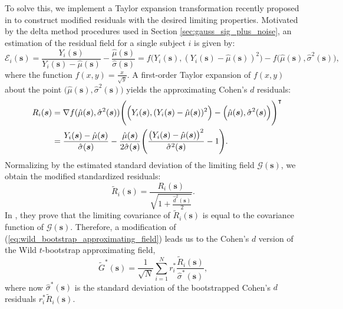 To solve this, we implement a Taylor expansion transformation recently proposed in \citet*{FABIANSPAPER} to construct modified residuals with the desired limiting properties. Motivated by the delta method procedures used in Section \ref{sec:gauss_sig_plus_noise}, an estimation of the residual field for a single subject $i$ is given by:
\begin{equation}
\label{eq:single_subject_residuals}
\mathcal{E}_{i}(\bm{s}) = \frac{Y_{i}(\bm{s})}{Y_{i}(\bm{s}) - \hat{\mu}(\bm{s})} - \frac{\hat{\mu}(\bm{s})}{\hat{\sigma}(\bm{s})} = f\Big(Y_{i}(\bm{s}),(Y_{i}(\bm{s}) - \hat{\mu}(\bm{s}))^{2}\Big) - f\Big(\hat{\mu}(\bm{s}), \hat{\sigma}^{2}(\bm{s})\Big),
\end{equation}
where the function $f(x,y) = \frac{x}{\sqrt{y}}$. A first-order Taylor expansion of $f(x,y)$ about the point $\Big(\hat{\mu}(\bm{s}), \hat{\sigma}^{2}(\bm{s})\Big)$ yields the approximating Cohen's $d$ residuals:
\begin{alignat}{4}
\label{eq:approximating_residuals}
&&R_{i}(\bm{s})
&= \nabla f(\hat{\mu}(\bm{s}),\hat{\sigma}^{2}(\bm{s}))\Bigg( \Big(Y_{i}(\bm{s}),(Y_{i}(\bm{s}) - \hat{\mu}(\bm{s}))^{2}\Big) - \Big(\hat{\mu}(\bm{s}), \hat{\sigma}^{2}(\bm{s}) \Big) \Bigg)^{\intercal}\notag\\
&
&
&= \frac{Y_{i}(\bm{s}) - \hat{\mu}(\bm{s})}{\hat{\sigma}(\bm{s})} - \frac{\hat{\mu}(\bm{s})}{2\hat{\sigma}(\bm{s})}\Bigg( \frac{\big(Y_{i}(\bm{s}) - \hat{\mu}(\bm{s})\big)^{2}}{\hat{\sigma}^{2}(\bm{s})} - 1 \Bigg).
\end{alignat}
Normalizing by the estimated standard deviation of the limiting field $\mathcal{G}(\bm{s})$, we obtain the modified standardized residuals:
\begin{equation}
\label{eq:cohens_d_residuals}
\tilde{R}_{i}(\bm{s}) = \frac{R_{i}(\bm{s})}{\sqrt{1 + \frac{\hat{d}^{2}(\bm{s})}{2}}}.
\end{equation}
In \citeauthor{FABIANSPAPER}, they prove that the limiting covariance of $\tilde{R}_{i}(\bm{s})$ is equal to the covariance function of $\mathcal{G}(\bm{s})$. Therefore, a modification of (\ref{eq:wild_bootstrap_approximating_field}) leads us to the Cohen's  $d$ version of the Wild $t$-bootstrap approximating field,
\begin{equation}
\label{eq:cohen_d_wild_bootstrap_approximating_field}
\tilde{G}^{*}(\bm{s}) = \frac{1}{\sqrt{N}}\sum_{i=1}^{N} r^*_i\frac{\tilde{R}_{i}(\bm{s})}{\hat{\sigma}^*(\bm{s})},
\end{equation}
where now $\hat{\sigma}^*(\bm{s})$ is the standard deviation of the bootstrapped Cohen's $d$ residuals $r_i^{*}\tilde{R}_{i}(\bm{s})$.

